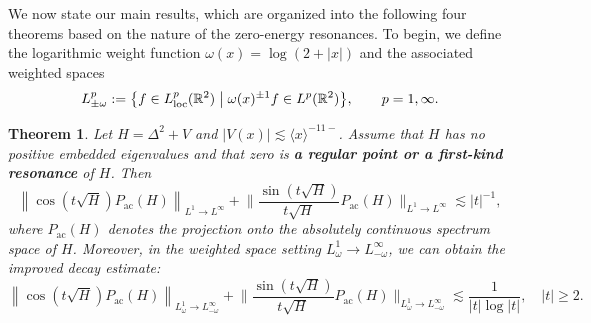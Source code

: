 \documentclass[reqno]{amsart}
\newtheorem{theorem}{Theorem}[section]
\numberwithin{equation}{section}
\begin{document}
 We now state our main results, which are organized into the following four theorems  based on the nature of the zero-energy resonances. To begin, we define the logarithmic weight function $\omega(x) = \log(2+|x|)$ and the associated weighted spaces
\[
L^p_{\pm \omega} := \bigl\{ f \in L_{\mathrm{loc}}^p(\mathbb{R}^2) \bigm| \omega(x)^{\pm 1} f \in L^p(\mathbb{R}^2) \bigr\}, \qquad p = 1, \infty.
\]




\begin{theorem}\label{main_theorem-1}
Let $H = \Delta^2 + V$ and $|V(x)| \lesssim \langle x \rangle^{-11-}$. 
Assume that $H$ has no positive embedded eigenvalues and that zero is \textbf{a regular point or a first-kind resonance} of $H$.
Then 
\begin{equation}\label{regular_first}
    \left\|\cos (t \sqrt{H}) P_{\mathrm{ac}}(H)\right\|_{L^1 \to L^{\infty}} +
    \bigg\|\frac{\sin (t \sqrt{H})}{t\sqrt{H}} P_{\mathrm{ac}}(H)\bigg\|_{L^1 \to L^{\infty}} \lesssim |t|^{-1},
\end{equation}where $P_{\mathrm{ac}}(H)$ denotes the projection onto the absolutely continuous spectrum space of $H$. Moreover, in the weighted space setting $L^1_\omega \to L^{\infty}_{-\omega}$, we can obtain the improved decay estimate:
\begin{equation}\label{regular_first_weight}
    \left\|\cos (t \sqrt{H}) P_{\mathrm{ac}}(H)\right\|_{L^1_\omega \to L^{\infty}_{-\omega}} +
    \bigg\|\frac{\sin (t \sqrt{H})}{t\sqrt{H}} P_{\mathrm{ac}}(H)\bigg\|_{L^1_\omega \to L^{\infty}_{-\omega}} \lesssim \frac{1}{|t| \log|t|}, \quad |t|\ge2.
\end{equation}
\end{theorem}
\end{document}
